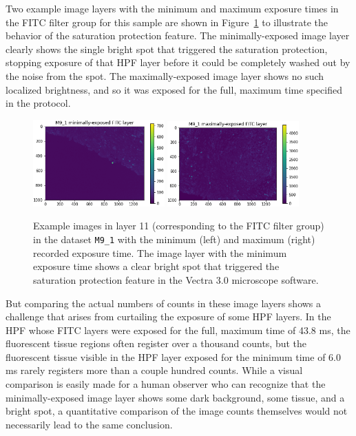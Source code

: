 \documentclass[letterpaper,11pt]{article}
\newcommand{\reffig}[1]{Figure~\ref{#1}}
\begin{document}
Two example image layers with the minimum and maximum exposure times in the FITC filter group for this sample are shown in \reffig{fig:max_min_M9_1_fitc_images} to illustrate the behavior of the saturation protection feature. The minimally-exposed image layer clearly shows the single bright spot that triggered the saturation protection, stopping exposure of that HPF layer before it could be completely washed out by the noise from the spot. The maximally-exposed image layer shows no such localized brightness, and so it was exposed for the full, maximum time specified in the protocol.

\begin{figure}[!ht]
\centering
\includegraphics[width=0.45\textwidth]{images/introduction/min_exposure_M9_1_fitc_image}
\includegraphics[width=0.45\textwidth]{images/introduction/max_exposure_M9_1_fitc_image}
\caption{\footnotesize Example images in layer 11 (corresponding to the FITC filter group) in the dataset \texttt{M9\_1} with the minimum (left) and maximum (right) recorded exposure time. The image layer with the minimum exposure time shows a clear bright spot that triggered the saturation protection feature in the Vectra 3.0 microscope software.}
\label{fig:max_min_M9_1_fitc_images}
\end{figure}

But comparing the actual numbers of counts in these image layers shows a challenge that arises from curtailing the exposure of some HPF layers. In the HPF whose FITC layers were exposed for the full, maximum time of 43.8 ms, the fluorescent tissue regions often register over a thousand counts, but the fluorescent tissue visible in the HPF layer exposed for the minimum time of 6.0 ms rarely registers more than a couple hundred counts. While a visual comparison is easily made for a human observer who can recognize that the minimally-exposed image layer shows some dark background, some tissue, and a bright spot, a quantitative comparison of the image counts themselves would not necessarily lead to the same conclusion.
\end{document}
